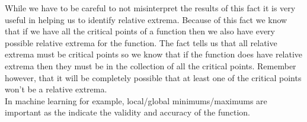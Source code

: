 \documentclass{article}
\begin{document}
While we have to be careful to not misinterpret the results of this fact it is very useful in helping us to identify relative extrema. Because of this fact we know that if we have all the critical points of a function then we also have every possible relative extrema for the function. The fact tells us that all relative extrema must be critical points so we know that if the function does have relative extrema then they must be in the collection of all the critical points. Remember however, that it will be completely possible that at least one of the critical points won’t be a relative extrema.\\

In machine learning for example, local/global minimums/maximums are important as the indicate the validity and accuracy of the function.
\end{document}
